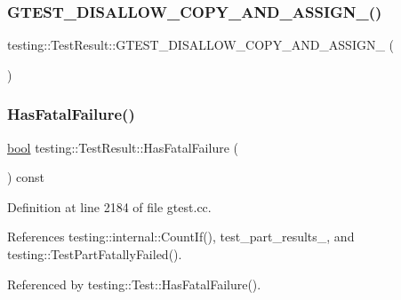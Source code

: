 \subsubsection{\texorpdfstring{G\+T\+E\+S\+T\+\_\+\+D\+I\+S\+A\+L\+L\+O\+W\+\_\+\+C\+O\+P\+Y\+\_\+\+A\+N\+D\+\_\+\+A\+S\+S\+I\+G\+N\+\_\+()}{GTEST\_DISALLOW\_COPY\_AND\_ASSIGN\_()}}
{\footnotesize\ttfamily testing\+::\+Test\+Result\+::\+G\+T\+E\+S\+T\+\_\+\+D\+I\+S\+A\+L\+L\+O\+W\+\_\+\+C\+O\+P\+Y\+\_\+\+A\+N\+D\+\_\+\+A\+S\+S\+I\+G\+N\+\_\+ (\begin{DoxyParamCaption}\item[{\hyperlink{classtesting_1_1TestResult}{Test\+Result}}]{ }\end{DoxyParamCaption})\hspace{0.3cm}{\ttfamily [private]}}

\mbox{\label{classtesting_1_1TestResult_a30e00d4076ae07fb5ad7b623d9dc1fe4}} 
\subsubsection{\texorpdfstring{Has\+Fatal\+Failure()}{HasFatalFailure()}}
{\footnotesize\ttfamily \hyperlink{classbool}{bool} testing\+::\+Test\+Result\+::\+Has\+Fatal\+Failure (\begin{DoxyParamCaption}{ }\end{DoxyParamCaption}) const}



Definition at line 2184 of file gtest.\+cc.



References testing\+::internal\+::\+Count\+If(), test\+\_\+part\+\_\+results\+\_\+, and testing\+::\+Test\+Part\+Fatally\+Failed().



Referenced by testing\+::\+Test\+::\+Has\+Fatal\+Failure().


